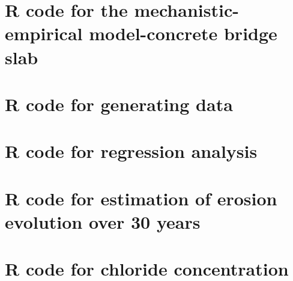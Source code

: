 \begin{subappendices}
\section{R code for the mechanistic-empirical model-concrete bridge slab}\label{mepi1}

\pagebreak
\section{R code for generating data}\label{mepi2}

\pagebreak
\section{R code for regression analysis} \label{mepi3}

\pagebreak
\section{R code for estimation of erosion evolution over 30 years} \label{mepi4}

\pagebreak
\section{R code for chloride concentration} \label{mepi5}

\end{subappendices}
% 

 
 
 
 
 
 
 